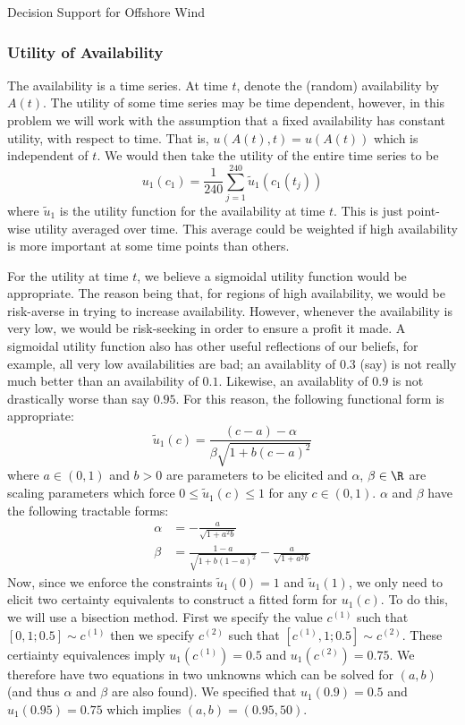 \begin{chapter}{Decision Support for Offshore Wind \label{Ch:ds-for-ow}}
\subsubsection{Utility of Availability}
The availability is a time series. At time $t$, denote the (random) availability by $A(t)$. The utility of some time series may be time dependent, however, in this problem we will work with the assumption that a fixed availability has constant utility, with respect to time. That is, $u(A(t), t)  = u(A(t))$ which is independent of $t$. We would then take the utility of the entire time series to be
\begin{equation}
  u_1(c_1)  = \frac{1}{240}\sum_{j = 1}^{240} \tilde{u}_{1}(c_1(t_j))
\end{equation}
where $\tilde{u}_{1}$ is the utility function for the availability at time $t$. This is just point-wise utility averaged over time. This average could be weighted if high availability is more important at some time points than others.

For the utility at time $t$, we believe a sigmoidal utility function would be appropriate. The reason being that, for regions of high availability, we would be risk-averse in trying to increase availability. However, whenever the availability is very low, we would be risk-seeking in order to ensure a profit it made. A sigmoidal utility function also has other useful reflections of our beliefs, for example, all very low availabilities are bad; an availablity of $0.3$ (say) is not really much better than an availability of $0.1$. Likewise, an availablity of $0.9$ is not drastically worse than say $0.95$. For this reason, the following functional form is appropriate:
\begin{equation}
  \tilde{u}_{1}(c)  = \frac{(c - a) - \alpha}{\beta\sqrt{1 + b (c-a)^2}}
\end{equation}
where $a \in (0,1)$  and $b>0$ are parameters to be elicited and $\alpha$, $\beta \in \R$ are scaling parameters which force $0 \leq \tilde{u}_{1}(c) \leq 1$ for any $c \in (0,1)$. $\alpha$ and $\beta$ have the following tractable forms:
\begin{align}
  \alpha &= -\frac{a}{\sqrt{1 + a^2b}}\\
  \beta &= \frac{1 - a}{\sqrt{1 + b(1-a)^2}} -\frac{a}{\sqrt{1 + a^2b}}
\end{align}
Now, since we enforce the constraints $\tilde{u}_1(0) = 1$ and $\tilde{u}_1(1)$, we only need to elicit two certainty equivalents to construct a fitted form for $u_1(c)$.  To do this, we will use a bisection method. First we specify the value $c^{(1)}$ such that $[0,  1; 0.5]  \sim c^{(1)}$ then we specify $c^{(2)}$ such that $[c^{(1)}, 1; 0.5] \sim c^{(2)}$. These certiainty equivalences imply $u_1(c^{(1)}) = 0.5$ and $u_1(c^{(2)}) = 0.75$. We therefore have two equations in two unknowns which can be solved for $(a , b)$ (and thus $\alpha$ and $\beta$ are also found). We specified that $u_1(0.9)= 0.5$  and $u_1(0.95) = 0.75$ which implies $(a, b) = (0.95, 50)$.

\end{chapter}
